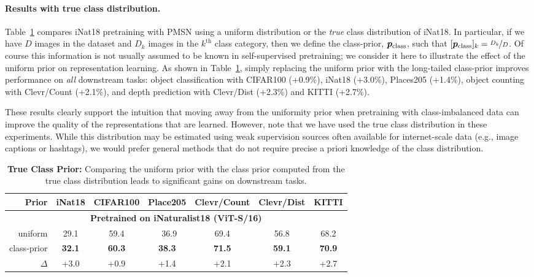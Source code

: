 \documentclass{article} %
\begin{document}
\paragraph{Results with true class distribution.}
Table~\ref{tb:inat_class_prior} compares iNat18 pretraining with PMSN using a uniform distribution or the \emph{true} class distribution of iNat18.
In particular, if we have $D$ images in the dataset and $D_k$ images in the $k^{\text{th}}$ class category, then we define the class-prior, ${\bm{p}}_{\text{class}}$, such that $[{\bm{p}}_{\text{class}}]_k = \nicefrac{D_k}{D}$.
Of course this information is not usually assumed to be known in self-supervised pretraining; we consider it here to illustrate the effect of the uniform prior on representation learning.
As shown in Table~\ref{tb:inat_class_prior}, simply replacing the uniform prior with the long-tailed class-prior improves performance on \emph{all} downstream tasks: object classification with CIFAR100 (+0.9\%), iNat18  (+3.0\%), Places205  (+1.4\%), object counting with Clevr/Count  (+2.1\%), and depth prediction with Clevr/Dist (+2.3\%) and KITTI (+2.7\%).

These results clearly support the intuition that moving away from the uniformity prior when pretraining with class-imbalanced data can improve the quality of the representations that are learned.
However, note that we have used the true class distribution in these experiments.
While this distribution may be estimated using weak supervision sources often available for internet-scale data (e.g., image captions or hashtags), we would prefer general methods that do not require precise a priori knowledge of the class distribution.

\begin{table}[h]
    \centering
    \footnotesize
    \caption{\textbf{True Class Prior:} Comparing the uniform prior with the class prior computed from the true class distribution leads to significant gains on downstream tasks.}
    \label{tb:inat_class_prior}
    \begin{tabular}{r|cccc|cc}
        \toprule
        Prior & iNat18 & CIFAR100 & Place205 & Clevr/Count & Clevr/Dist & KITTI\\
        \toprule\toprule
        \multicolumn{7}{c}{\scriptsize\bf Pretrained on iNaturalist18 (ViT-S/16)}\\[1mm]
        uniform & 29.1 & 59.4 & \ 36.9 & 69.4 & 56.8 & 68.2 \\
        class-prior &  \bf 32.1 & \bf 60.3 & \bf 38.3 &  \bf 71.5 & \bf 59.1 & \bf 70.9 \\
        $\Delta$ & \color{blue} +3.0 & \color{blue} +0.9 & \color{blue} +1.4 & \color{blue} +2.1 & \color{blue} +2.3 & \color{blue} +2.7\\
        \bottomrule
    \end{tabular}
\end{table}
\end{document}
